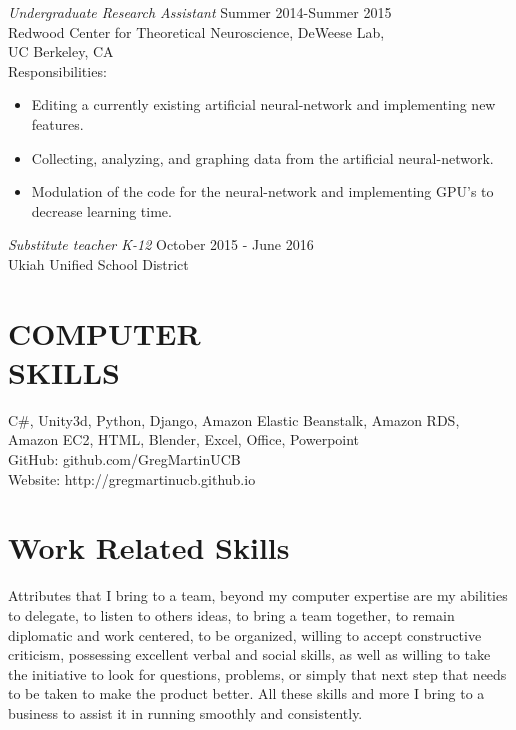 \documentclass[line,margin]{res}
\begin{document}
\begin{resume}
 {\sl Undergraduate Research Assistant} \hfill Summer 2014-Summer 2015 \\
                Redwood Center for Theoretical Neuroscience, DeWeese Lab,\\ 
                UC Berkeley, CA\\
            		Responsibilities:
                 \begin{itemize}  \itemsep -2pt %
                 \item Editing a currently existing artificial neural-network and implementing new features.
                 \item Collecting, analyzing, and graphing data from the artificial neural-network. 
                 \item Modulation of the code for the neural-network and implementing GPU's to decrease learning time.
                \end{itemize}
                
               {\sl Substitute teacher K-12} \hfill October 2015 - June 2016\\
               Ukiah Unified School District
\section{COMPUTER \\ SKILLS} C\#, Unity3d, Python, Django, Amazon Elastic Beanstalk, Amazon RDS, Amazon EC2, HTML, Blender, Excel, Office, Powerpoint\\
			
                GitHub:  github.com/GregMartinUCB\\
                Website: http://gregmartinucb.github.io\\

	

				               
 
\section{Work Related Skills}
  Attributes that I bring to a team, beyond my computer expertise are my abilities to delegate, to listen to others ideas, to bring a team together, to remain diplomatic and work centered, to be organized, willing to accept constructive criticism, possessing excellent verbal and social skills, as well as willing to take the initiative to look for questions, problems, or simply that next step that needs to be taken to make the product better. All these skills and more I bring to a business to assist it in running smoothly and consistently. 

\end{resume}
\end{document}
